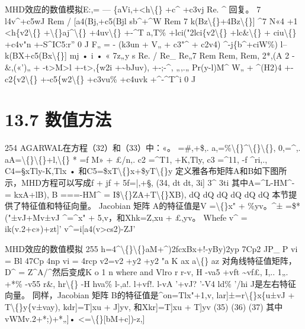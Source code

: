 \documentclass[UTF8,11pt,a4paper,openany,fontset=fandol]{ctexbook}
\begin{document}
MHD效应的数值模拟E:,= --- \{aVi,+<h\textbackslash\{\} +c\textasciicircum{} +c3vj Re. \textasciicircum{} 回复。 7 l4v\textasciicircum{}+c5wJ Rem / [a4(Bj,+c5(Bjl sb\textasciicircum{}+\textasciicircum{}W Rem 7 k(Bz\textbackslash\{\}+4Bz\textbackslash\{\}] \textasciicircum{}7 N«4 +1 <h\{v2\textbackslash\{\} +\textbackslash\{\}aj\textasciicircum{}\textbackslash\{\} +4uv\textbackslash\{\} +-\textasciicircum{}T a,T\% +lci("2lci\{v2\textbackslash\{\} +lc\&\textbackslash\{\} + ciu\textbackslash\{\} +c4v"n +-S\textasciicircum{}IC5:r'' 0 J F„ = - (k3un + V„ + c3"\textasciicircum{} + c2v4) \textasciicircum{}-j\{b\textasciicircum{}+ciW\%) l--k(BX+c5(Bx\textbackslash\{\}] mj • i • « 7z„y s Re. / Re\_ Re„7 Rem Rem, Rem, 2*,(A 2 -\&,(«')„ + -t>M>l +-t>,\{w2i +\textasciitilde{}bJuv), +-;-\textasciicircum{}, „,.„ Pr(y-l)M\textasciicircum{} W„ + \textasciicircum{}(H2)4 +-c2\{v2\textbackslash\{\} +-c5\{w2\textbackslash\{\} +c3vu\% +c4uvk +\textasciicircum{}-\textasciicircum{}T\textasciicircum{}i 0 J

\section{13.7 数值方法}
254 AGARWAL在方程（32）和（33）中：«。 =\#,+\$,. a,=\%\textbackslash\{\}\textasciicircum{}\textbackslash\{\}\textbackslash\{\}, 0,=\textasciicircum{},. aA=\textbackslash\{\}\textbackslash\{\}+l,\textbackslash\{\} * =f M» + £/n,. c2 =\textasciicircum{}T1, +K,Tly, c3 =\textasciicircum{}11, -f \textasciicircum{}ri,., C4=§xTly-K,Tlx • 和C5=\$xT\textbackslash\{\}x+\$yT\textbackslash\{\}y 定义雅各布矩阵A和B如下图所示，MHD方程可以写成f + jf + 5f=|,+§, (34, dt dt, 3i] 3\textasciicircum{} 3ti 其中A=\textasciicircum{}L-HM\textasciicircum{}- = kxA+lB), B ===-HM\textasciicircum{} = I\$\textbackslash\{\}ZA+T\textbackslash\{\}XB), dQ dQ dQ dQ dQ dQ 本节提供了特征值和特征向量。 Jacobian 矩阵 A的特征值是V =\textbackslash\{\}x" + \%yv。\textasciicircum{}± =\$*("±vJ+Mv±vJ \textasciicircum{}=\textasciicircum{}x" + 5,v，和Xhk=Z,xu + £,yv。 Whefe v\textasciicircum{} = ik(v.2+c»)+zt]' v\textasciicircum{}=i[a4(v>cs2)-ZJ'

MHD效应的数值模拟 255 h=4\textasciicircum{}\textbackslash\{\}\textbackslash\{\}aM+\textasciicircum{})2fcxBx+!-yBy)2yp 7Cp2 JP\_ P vi = Bl 47Cp 4np vi = 4rcp v2=v2 +y2 +y2 "a K ax a\textbackslash\{\} az 对角线特征值矩阵，D\textasciicircum{} = Z\textasciicircum{}A/\textasciicircum{}然后变成K o 1 n where and Vlro r r-v, H -va5 +vft \textasciitilde{}vf£, I,.. 1„. +*\% -v55 r\&, hr\textbackslash\{\} -H hva\% l-,a!. l+vf!. l-vA '+vJ? '-V4 ld\% '/hi J是左右特征向量。 同样，Jacobian 矩阵 B的特征值是\textasciicircum{}on=Tlx"+1,v, lar]±=r\textbackslash\{\}x\{u±vJ + T\textbackslash\{\}y\{v±vay), kdr]=T]xu + J]yv, 和Xkr]=T]xu + T]yv (35) (36) (37) 其中vWMv.2+*;)+*„]• <=\textbackslash\{\}[bM+c])-z,]
\end{document}
